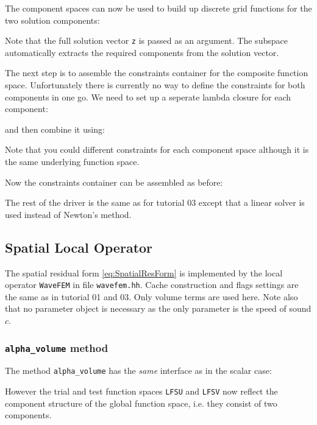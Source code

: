 \documentclass[a4paper,12pt]{article}
\begin{document}
The component spaces can now be used to build
up discrete grid functions for the two solution components:

Note that the full solution vector \lstinline{z} is passed as an argument.
The subspace automatically extracts the required components from the solution vector.

The next step is to assemble the constraints container for the composite
function space. Unfortunately there is currently no way to define the
constraints for both components in one go. We need to
set up a seperate lambda closure for each component:

and then combine it using:

Note that you could different constraints for each component
space although it is the same underlying function space.

Now the constraints container can be assembled as before:


The rest of the driver is the same as for tutorial 03 except that
a linear solver is used instead of Newton's method.

\subsection{Spatial Local Operator}

The spatial residual form \eqref{eq:SpatialResForm} is
implemented by the local operator \lstinline{WaveFEM} in
file \lstinline{wavefem.hh}. Cache construction and flags settings
are the same as in tutorial 01 and 03. Only volume terms are used here.
Note also that no parameter object is necessary as the only parameter 
is the speed of sound $c$.

\subsubsection*{\lstinline{alpha_volume} method}

The method \lstinline{alpha_volume} has the \textit{same} interface
as in the scalar case:

However the trial and test function spaces \lstinline{LFSU} and \lstinline{LFSV}
now reflect the component structure of the global function space, i.e.
they consist of two components.
\end{document}
